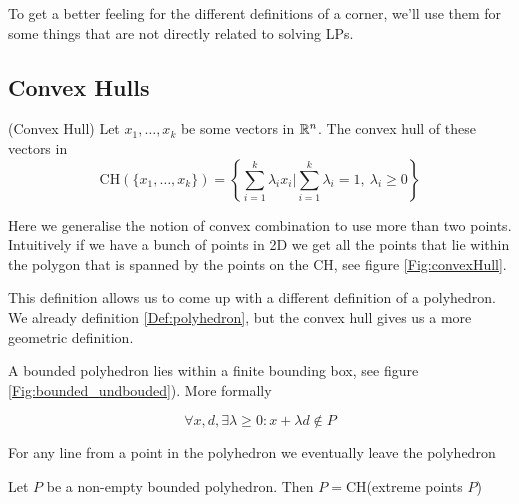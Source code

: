 To get a better feeling for the different definitions of a corner, we'll use them for some things that are not directly related to solving LPs.

\subsection*{Convex Hulls}
\begin{Def}(Convex Hull) Let $x_1,\ldots,x_k$ be some vectors in $\mathbb{R}^n$. The convex hull of these vectors in
\[\mbox{CH}(\{x_1,\ldots,x_k\}) = \left\{\sum _{i=1}^k \lambda_i x_i | \sum_{i=1}^k \lambda_i =1,\ \lambda_i\geq 0\right\}\]
\end{Def}

Here we generalise the notion of convex combination to use more than two points. Intuitively if we have a bunch of points in 2D we get all the points that lie within the polygon that is spanned by the points on the CH, see figure \ref{Fig:convexHull}.

This definition allows us to come up with a different definition of a polyhedron. We already definition \ref{Def:polyhedron}, but the convex hull gives us a more geometric definition.

\begin{Def} A bounded polyhedron lies within a finite bounding box, see figure \ref{Fig:bounded_undbouded}). More formally

\[\forall x,d, \exists \lambda\geq 0: x+\lambda d \not \in P\]

For any line from a point in the polyhedron we eventually leave the polyhedron
\end{Def}

\begin{thm}\label{Thm:CH_polyhedron} Let $P$ be a non-empty bounded polyhedron. Then $P=$CH(extreme points $P$)
\end{thm}

